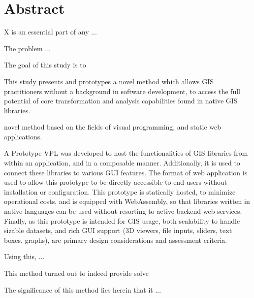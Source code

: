\chapter*{Abstract}

X is an essential part of any ...

The problem ...

The goal of this study is to

This study presents and prototypes a novel method which allows \ac{GIS} practitioners without a background in software development, to access the full potential of core transformation and analysis capabilities found in native \ac{GIS} libraries.



novel method based on the fields of visual programming, and static web applications. 


A Prototype VPL was developed to host the functionalities of \ac{GIS} libraries from within an application, and in a composable manner. Additionally, it is used to connect these libraries to various \ac{GUI} features. 
The format of web application is used to allow this prototype to be directly accessible to end users without installation or configuration. 
This prototype is statically hosted, to minimize operational costs, and is equipped with WebAssembly, so that libraries written in native languages can be used without resorting to active backend web services. 
Finally, as this prototype is intended for \ac{GIS} usage, both scalability to handle sizable datasets, and rich \ac{GUI} support (3D viewers, file inputs, sliders, text boxes, graphs), are primary design considerations and assessment criteria.

Using this, ...

This method turned out to indeed provide solve

The significance of this method lies herein that it ...


